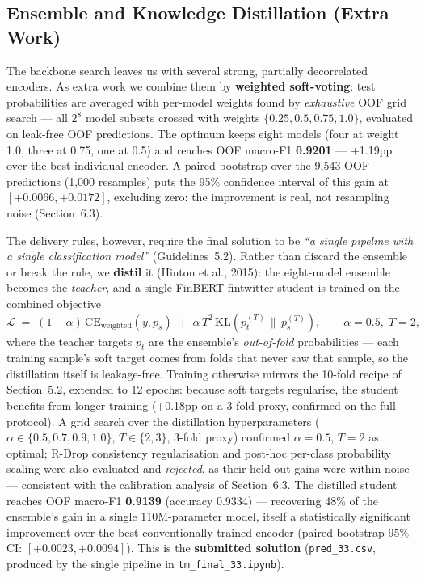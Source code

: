 \documentclass[11pt,a4paper]{article}
\newcommand{\distf}{0.9139}    %
\newcommand{\distacc}{0.9334}  %
\begin{document}
\subsection{Ensemble and Knowledge Distillation (Extra Work)}
\label{sec:distill}
The backbone search leaves us with several strong, partially decorrelated encoders. As extra work
we combine them by \textbf{weighted soft-voting}: test probabilities are averaged with per-model
weights found by \emph{exhaustive} OOF grid search --- all $2^8$ model subsets crossed with weights
$\{0.25, 0.5, 0.75, 1.0\}$, evaluated on leak-free OOF predictions. The optimum keeps eight models
(four at weight 1.0, three at 0.75, one at 0.5) and reaches OOF macro-F1 \textbf{0.9201} ---
+1.19pp over the best individual encoder. A paired bootstrap over the 9{,}543 OOF predictions
(1{,}000 resamples) puts the 95\% confidence interval of this gain at $[+0.0066, +0.0172]$,
excluding zero: the improvement is real, not resampling noise (Section~6.3).

The delivery rules, however, require the final solution to be \emph{``a single pipeline with a
single classification model''} (Guidelines~5.2). Rather than discard the ensemble or break the
rule, we \textbf{distil} it (Hinton et al., 2015): the eight-model ensemble becomes the
\emph{teacher}, and a single FinBERT-fintwitter student is trained on the combined objective
\[
\mathcal{L} \;=\; (1-\alpha)\,\mathrm{CE}_{\text{weighted}}(y, p_s)
\;+\; \alpha\, T^2\, \mathrm{KL}\!\left(p_t^{(T)} \,\|\, p_s^{(T)}\right),
\qquad \alpha = 0.5,\; T = 2,
\]
where the teacher targets $p_t$ are the ensemble's \emph{out-of-fold} probabilities --- each
training sample's soft target comes from folds that never saw that sample, so the distillation
itself is leakage-free. Training otherwise mirrors the 10-fold recipe of Section~5.2, extended to
12 epochs: because soft targets regularise, the student benefits from longer training (+0.18pp on
a 3-fold proxy, confirmed on the full protocol). A grid search
over the distillation hyperparameters ($\alpha \in \{0.5, 0.7, 0.9, 1.0\}$, $T \in \{2, 3\}$,
3-fold proxy) confirmed $\alpha{=}0.5$, $T{=}2$ as optimal; R-Drop consistency regularisation and
post-hoc per-class probability scaling were also evaluated and \emph{rejected}, as their held-out
gains were within noise --- consistent
with the calibration analysis of Section~6.3. The distilled
student reaches OOF macro-F1 \textbf{\distf} (accuracy \distacc) --- recovering 48\% of the
ensemble's gain in a single 110M-parameter model, itself a statistically significant improvement
over the best conventionally-trained encoder (paired bootstrap 95\% CI: $[+0.0023, +0.0094]$).
This is the \textbf{submitted solution} (\nolinkurl{pred_33.csv}, produced by the single pipeline
in \nolinkurl{tm_final_33.ipynb}).
\end{document}
